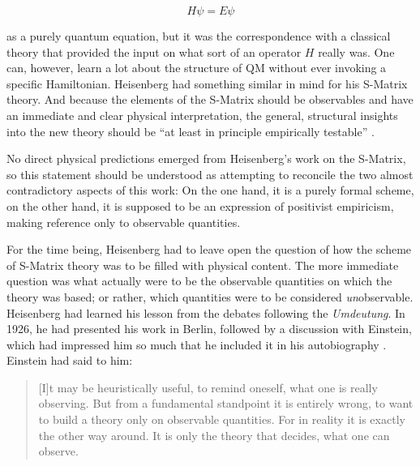 \documentclass[12pt]{article}
\begin{document}
\begin{equation}
H \psi = E \psi
\end{equation}

as a purely quantum equation, but it was the correspondence with a classical theory that provided the input on what sort of an operator $H$ really was. One can, however, learn a lot about the structure of QM without ever invoking a specific Hamiltonian. Heisenberg had something similar in mind for his S-Matrix theory. And because the elements of the S-Matrix should be observables and have an immediate and clear physical interpretation, the general, structural insights into the new theory should be ``at least in principle empirically testable'' \citep[p.514]{heisenberg_1943_die-beobachtbaren}.

No direct physical predictions emerged from Heisenberg's work on the S-Matrix, so this statement should be understood as attempting to reconcile the two almost contradictory aspects of this work: On the one hand, it is a purely formal scheme, on the other hand, it is supposed to be an expression of positivist empiricism, making reference only to observable quantities.

For the time being, Heisenberg had to leave open the question of how the scheme of S-Matrix theory was to be filled with physical content. The more immediate question was what actually were to be the observable quantities on which the theory was based; or rather, which quantities were to be considered \emph{un}observable. Heisenberg had learned his lesson from the debates following the \emph{Umdeutung}. In 1926, he had presented his work in Berlin, followed by a discussion with Einstein, which had impressed him so much that he included it in his autobiography \citep{heisenberg_1969_der-teil}. Einstein had said to him:

\begin{quote}
[I]t may be heuristically useful, to remind oneself, what one is really observing. But from a fundamental standpoint it is entirely wrong, to want to build a theory only on observable quantities. For in reality it is exactly the other way around. It is only the theory that decides, what one can observe.
\end{quote}
\end{document}

